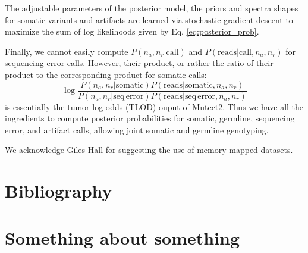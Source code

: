 \documentclass[times, twoside, watermark]{StyleBioRxiv}
\begin{document}
The adjustable parameters of the posterior model, the priors and spectra shapes for somatic variants and artifacts are learned via stochastic gradient descent to maximize the sum of log likelihoods given by Eq. \ref{eq:posterior_prob}.

Finally, we cannot easily compute $P(n_a, n_r | \mathrm{call})$ and $P(\mathrm{reads} | \mathrm{call}, n_a, n_r)$ for sequencing error calls.  However, their product, or rather the ratio of their product to the corresponding product for somatic calls:
\begin{equation}
    \log \frac{P(n_a, n_r | \mathrm{somatic}) P(\mathrm{reads} | \mathrm{somatic}, n_a, n_r)}{P(n_a, n_r | \mathrm{seq\,error}) P(\mathrm{reads} | \mathrm{seq\,error}, n_a, n_r)}
\end{equation}
is essentially the tumor log odds (TLOD) ouput of Mutect2.  Thus we have all the ingredients to compute posterior probabilities for somatic, germline, sequencing error, and artifact calls, allowing joint somatic and germline genotyping.

\begin{acknowledgements}
We acknowledge Giles Hall for suggesting the use of memory-mapped datasets.
\end{acknowledgements}

\section*{Bibliography}





\captionsetup*{format=largeformat}
\section{Something about something} \label{note:Note1} 

\end{document}
